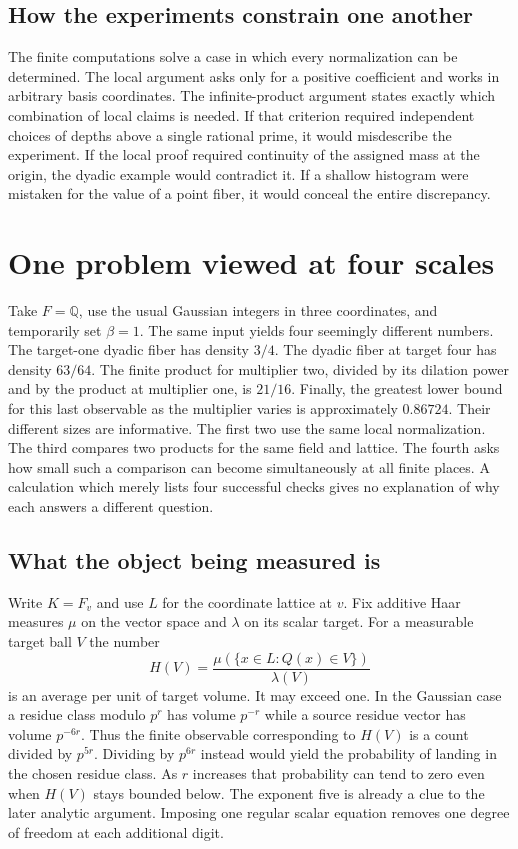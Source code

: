 \documentclass[12pt,letterpaper]{article}
\begin{document}
\subsection{How the experiments constrain one another}
The finite computations solve a case in which every normalization can be determined. The local argument asks only for a positive coefficient and works in arbitrary basis coordinates. The infinite-product argument states exactly which combination of local claims is needed. If that criterion required independent choices of depths above a single rational prime, it would misdescribe the experiment. If the local proof required continuity of the assigned mass at the origin, the dyadic example would contradict it. If a shallow histogram were mistaken for the value of a point fiber, it would conceal the entire discrepancy.

\section{One problem viewed at four scales}\label{sec:architecture}
Take $F=\mathbb Q$, use the usual Gaussian integers in three coordinates, and temporarily set $\beta=1$. The same input yields four seemingly different numbers. The target-one dyadic fiber has density $3/4$. The dyadic fiber at target four has density $63/64$. The finite product for multiplier two, divided by its dilation power and by the product at multiplier one, is $21/16$. Finally, the greatest lower bound for this last observable as the multiplier varies is approximately $0.86724$. Their different sizes are informative. The first two use the same local normalization. The third compares two products for the same field and lattice. The fourth asks how small such a comparison can become simultaneously at all finite places. A calculation which merely lists four successful checks gives no explanation of why each answers a different question.

\subsection{What the object being measured is}
Write $K=F_v$ and use $L$ for the coordinate lattice at $v$. Fix additive Haar measures $\mu$ on the vector space and $\lambda$ on its scalar target. For a measurable target ball $V$ the number
\[
             H(V)=\frac{\mu(\{x\in L:Q(x)\in V\})}{\lambda(V)}
\]
is an average per unit of target volume. It may exceed one. In the Gaussian case a residue class modulo $p^r$ has volume $p^{-r}$ while a source residue vector has volume $p^{-6r}$. Thus the finite observable corresponding to $H(V)$ is a count divided by $p^{5r}$. Dividing by $p^{6r}$ instead would yield the probability of landing in the chosen residue class. As $r$ increases that probability can tend to zero even when $H(V)$ stays bounded below. The exponent five is already a clue to the later analytic argument. Imposing one regular scalar equation removes one degree of freedom at each additional digit.
\end{document}
